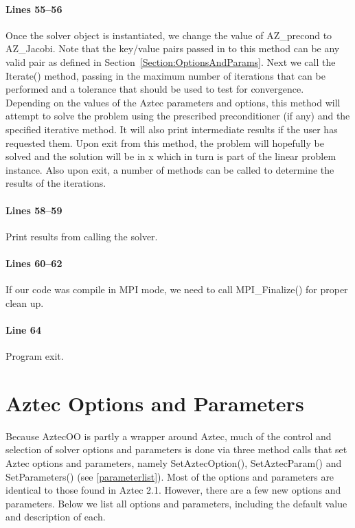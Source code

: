 \documentclass[12pt,relax]{AztecOOUserGuide}
\begin{document}
\paragraph{Lines 55--56}
Once the solver object is instantiated, we change the value of
AZ\_precond to AZ\_Jacobi.  Note that the key/value pairs passed in to
this method can be any valid pair as defined in
Section~\ref{Section:OptionsAndParams}.  Next we call the Iterate()
method, passing in the maximum number of iterations that can be
performed and a tolerance that should be used to test for
convergence.  Depending on the values of the Aztec parameters and
options, this method will attempt to solve the problem using the
prescribed preconditioner (if any) and the specified iterative
method.  It will also print intermediate results if the user has
requested them.  Upon exit from this method, the problem will
hopefully be solved and the solution will be in x which in turn is
part of the linear problem instance.  Also upon exit, a number of
methods can be called to determine the results of the iterations.
\paragraph{Lines 58--59}
Print results from calling the solver.
\paragraph{Lines 60--62}
If our code was compile in MPI mode, we need to call MPI\_Finalize()
for proper clean up.
\paragraph{Line 64} Program exit.

\section{Aztec Options and Parameters\label{Section:OptionsAndParams}}

Because AztecOO is partly a wrapper around Aztec, much of the
control and selection of solver options and parameters is done via three
method calls that set Aztec options and parameters, namely
SetAztecOption(), SetAztecParam() and SetParameters()
 (see \ref{parameterlist}).  Most of the
options and parameters are identical to those found in Aztec 2.1.
However, there are a few new options and parameters.  Below we
list all options and parameters, including the default value and
description of each.
\end{document}
